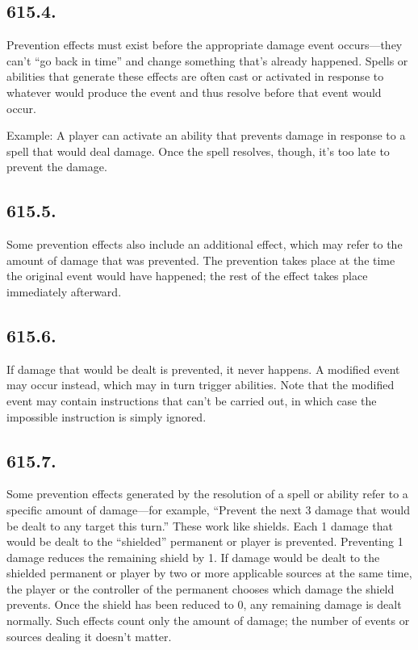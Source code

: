\subsection*{615.4.}
Prevention effects must exist before the appropriate damage event occurs—they can’t “go back in time” and change something that’s already happened. Spells or abilities that generate these effects are often cast or activated in response to whatever would produce the event and thus resolve before that event would occur.

Example: A player can activate an ability that prevents damage in response to a spell that would deal damage. Once the spell resolves, though, it’s too late to prevent the damage.

\subsection*{615.5.}
Some prevention effects also include an additional effect, which may refer to the amount of damage that was prevented. The prevention takes place at the time the original event would have happened; the rest of the effect takes place immediately afterward.

\subsection*{615.6.}
If damage that would be dealt is prevented, it never happens. A modified event may occur instead, which may in turn trigger abilities. Note that the modified event may contain instructions that can’t be carried out, in which case the impossible instruction is simply ignored.

\subsection*{615.7.}
Some prevention effects generated by the resolution of a spell or ability refer to a specific amount of damage—for example, “Prevent the next 3 damage that would be dealt to any target this turn.” These work like shields. Each 1 damage that would be dealt to the “shielded” permanent or player is prevented. Preventing 1 damage reduces the remaining shield by 1. If damage would be dealt to the shielded permanent or player by two or more applicable sources at the same time, the player or the controller of the permanent chooses which damage the shield prevents. Once the shield has been reduced to 0, any remaining damage is dealt normally. Such effects count only the amount of damage; the number of events or sources dealing it doesn’t matter.

